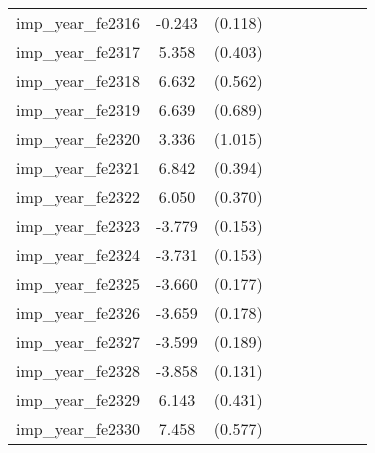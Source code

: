 {\begin{tabular}{l*{4}{cc}}
imp\_year\_fe2316&   -0.243\sym{*}  &  (0.118)&                  &         &                  &         &                  &         \\
imp\_year\_fe2317&    5.358\sym{***}&  (0.403)&                  &         &                  &         &                  &         \\
imp\_year\_fe2318&    6.632\sym{***}&  (0.562)&                  &         &                  &         &                  &         \\
imp\_year\_fe2319&    6.639\sym{***}&  (0.689)&                  &         &                  &         &                  &         \\
imp\_year\_fe2320&    3.336\sym{**} &  (1.015)&                  &         &                  &         &                  &         \\
imp\_year\_fe2321&    6.842\sym{***}&  (0.394)&                  &         &                  &         &                  &         \\
imp\_year\_fe2322&    6.050\sym{***}&  (0.370)&                  &         &                  &         &                  &         \\
imp\_year\_fe2323&   -3.779\sym{***}&  (0.153)&                  &         &                  &         &                  &         \\
imp\_year\_fe2324&   -3.731\sym{***}&  (0.153)&                  &         &                  &         &                  &         \\
imp\_year\_fe2325&   -3.660\sym{***}&  (0.177)&                  &         &                  &         &                  &         \\
imp\_year\_fe2326&   -3.659\sym{***}&  (0.178)&                  &         &                  &         &                  &         \\
imp\_year\_fe2327&   -3.599\sym{***}&  (0.189)&                  &         &                  &         &                  &         \\
imp\_year\_fe2328&   -3.858\sym{***}&  (0.131)&                  &         &                  &         &                  &         \\
imp\_year\_fe2329&    6.143\sym{***}&  (0.431)&                  &         &                  &         &                  &         \\
imp\_year\_fe2330&    7.458\sym{***}&  (0.577)&                  &         &                  &         &                  &         \\

\end{tabular}}
